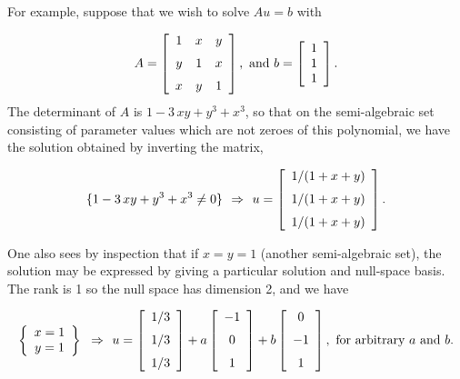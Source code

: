 \documentclass[10pt]{article}
\begin{document}
For example, suppose that we wish to solve $Au = b$ with

\[
A=\left [\begin {array}{ccc} 
1&x&y\\\noalign{\medskip}
y&1&x\\\noalign{\medskip}
x&y&1\end {array}\right ],~ \mbox{and}~
b=\left [\begin {array}{c} 1\\1\\1 \end {array}\right ].
\]
The determinant of $A$ is $ 1-3\,xy+{y}^{3}+{x}^{3} $, so that on the semi-algebraic set consisting of parameter values which are not zeroes of this
polynomial, we have the solution obtained by inverting the matrix,

\[
\{1-3\,xy+{y}^{3}+{x}^{3} \ne 0\}\implies 
u = \left [\begin {array}{c} 
1/(1+x+y)\\\noalign{\medskip}
1/(1+x+y)\\\noalign{\medskip}
1/(1+x+y)
\end {array}\right ].
\]


One also sees by inspection that if $x = y = 1 $ (another semi-algebraic set),
the solution may be expressed by giving a particular solution
and null-space basis.  The rank is 1 so the null space has dimension 2,
and we have 

\[
\breg x = 1\\ y = 1\ereg \implies
u = \left [\begin {array}{c} 1/3\\\noalign{\medskip}1/3\\\noalign{\medskip}1/3 \end {array}\right ]
+ a \left [\begin {array}{c} -1\\\noalign{\medskip}0\\\noalign{\medskip}1 \end {array}\right ]
+ b \left [\begin {array}{c} 0\\\noalign{\medskip}-1\\\noalign{\medskip}1 \end {array}\right ] , 
\for \mbox{arbitrary}~ a \und b.
\]
\end{document}
